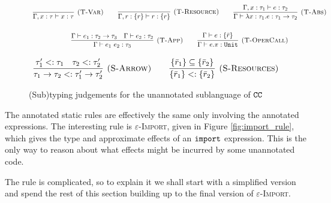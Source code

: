 \begin{figure}
\vspace{-5pt}


\[
\begin{array}{c}


\infer[\textsc{(T-Var)}]
	{\Gamma, x: \tau \vdash x: \tau}
	{}
\hspace{5ex}
\infer[\textsc{(T-Resource)}]
	{\Gamma, r: \{ r \} \vdash r : \{ r \}}
	{}

\hspace{5ex}
\infer[\textsc{(T-Abs)}]
	{\Gamma \vdash \lambda x: \tau_1.e : \tau_1 \rightarrow \tau_2}
	{\Gamma, x: \tau_1 \vdash e: \tau_2}\\[4ex]
	
\infer[\textsc{(T-App)}]
	{\Gamma \vdash e_1~e_2: \tau_3}
	{\Gamma \vdash e_1: \tau_2 \rightarrow \tau_3 & \Gamma \vdash e_2: \tau_2}
\hspace{5ex}
\infer[\textsc{(T-OperCall)}]
	{\Gamma \vdash e.\pi: \kwa{Unit}}
	{\Gamma \vdash e: \{ \bar r \}}

\end{array}
\]

\fbox{$\tau <: \tau$}

\[
\begin{array}{c}

\infer[\textsc{(S-Arrow)}]
	{ \tau_1 \rightarrow \tau_2 <: \tau_1' \rightarrow \tau_2' }
	{ \tau_1' <: \tau_1 & \tau_2 <: \tau_2' }
\hspace{5ex}
\infer[\textsc{(S-Resources)}]
	{ \{ \bar r_1 \} <: \{ \bar r_2 \} }
	{ \{ \bar r_1 \} \subseteq \{ \bar r_2 \} }

\end{array}
\]

\vspace{-0.3cm}
\caption{(Sub)typing judgements for the unannotated sublanguage of $\mathtt{CC}$}
\vspace{-0.3cm}
\label{fig:unannotated_static_rules}
\end{figure}

The annotated static rules are effectively the same only involving the
annotated expressions. The interesting rule is
\textsc{$\varepsilon$-Import}, given in Figure \ref{fig:import_rule},
which gives the type and approximate effects of an $\mathtt{import}$
expression. This is the only way to reason about what effects might be
incurred by some unannotated code.

The rule is complicated, so to explain it we shall start with a
simplified version and spend the rest of this section building up to
the final version of \textsc{$\varepsilon$-Import}.

